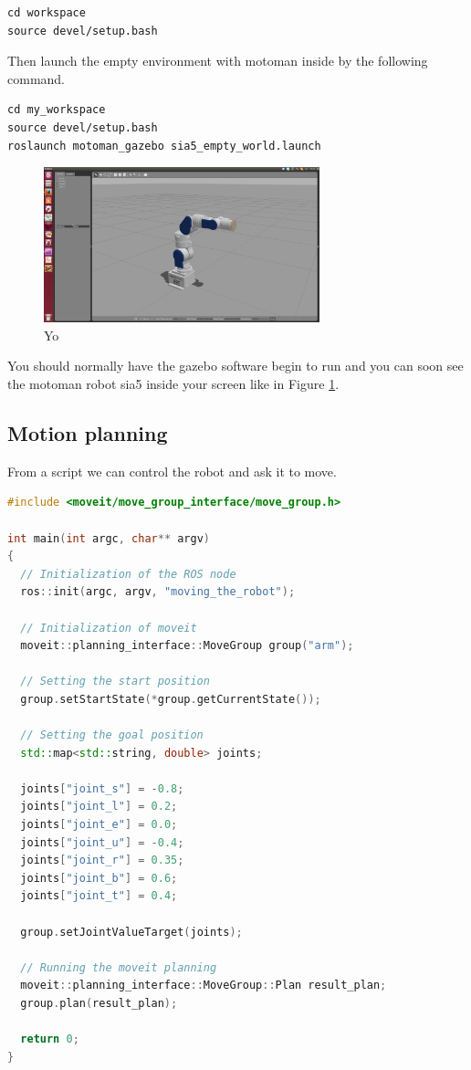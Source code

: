 \begin{lstlisting}
cd workspace
source devel/setup.bash
\end{lstlisting}

Then launch the empty environment with motoman inside by the following command.

\begin{lstlisting}
cd my_workspace
source devel/setup.bash
roslaunch motoman_gazebo sia5_empty_world.launch
\end{lstlisting}
\begin{figure}
\includegraphics[width=8cm]{images/utilisation/launch_gazebo.png}
\centering
\caption{Yo}
\label{fig:launch_gazebo}
\end{figure}
You should normally have the gazebo software begin to run and you can soon see the motoman robot sia5 inside your screen like in Figure \ref{fig:launch_gazebo}.

\subsection{Motion planning}

From a script we can control the robot and ask it to move. 

\begin{lstlisting}[language=c++]
#include <moveit/move_group_interface/move_group.h>

int main(int argc, char** argv)
{
  // Initialization of the ROS node
  ros::init(argc, argv, "moving_the_robot");

  // Initialization of moveit 
  moveit::planning_interface::MoveGroup group("arm");

  // Setting the start position
  group.setStartState(*group.getCurrentState());

  // Setting the goal position
  std::map<std::string, double> joints;
      
  joints["joint_s"] = -0.8;
  joints["joint_l"] = 0.2;
  joints["joint_e"] = 0.0;
  joints["joint_u"] = -0.4;
  joints["joint_r"] = 0.35;
  joints["joint_b"] = 0.6;
  joints["joint_t"] = 0.4;
      
  group.setJointValueTarget(joints);

  // Running the moveit planning
  moveit::planning_interface::MoveGroup::Plan result_plan;
  group.plan(result_plan);
  
  return 0;
}
\end{lstlisting}

